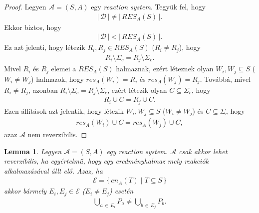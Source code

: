 \documentclass[12pt]{article}
\theoremstyle{definition}
\theoremstyle{remark}
\theoremstyle{plain}
\theoremstyle{plain}
\newtheorem*{lemma*}{Lemma}
\newcommand{\en}{\textit{en}}
\newcommand{\res}{\textit{res}}
\begin{document}
    \begin{proof}
        Legyen $\mathscr{A} = (S, A)$ egy \textit{reaction system}. Tegyük fel, hogy 
        \begin{align*}
            |\,\mathcal{D}\,| \neq |\,\textit{RES}_{A}(S)\,|.
        \end{align*}
        Ekkor biztos, hogy
        \begin{align*}
            |\,\mathcal{D}\,| < |\,\textit{RES}_{A}(S)\,|.
        \end{align*}
        Ez azt jelenti, hogy létezik $R_{i}, R_{j} \in \textit{RES}_{A}(S)$ ($R_{i} \neq R_{j}$), hogy
        \begin{align*}
            R_{i} \setminus \Sigma_{c} = R_{j} \setminus \Sigma_{c}.
        \end{align*}
        Mivel $R_{i}$ és $R_{j}$ elemei a $\textit{RES}_{A}(S)$ halmaznak, ezért léteznek olyan $W_{i}, W_{j} \subseteq S$ ($W_{i} \neq W_{j}$) halmazok, hogy $\res_{A}(W_{i}) = R_{i}$ és $\res_{A}(W_{j}) = R_{j}$. Továbbá, mivel $R_{i} \neq R_{j}$, azonban $R_{i} \setminus \Sigma_{c} = R_{j} \setminus \Sigma_{c}$, ezért létezik olyan $C \subseteq \Sigma_{c}$, hogy
        \begin{align*}
            R_{i} \cup C = R_{j} \cup C.
        \end{align*}
        Ezen állítások azt jelentik, hogy létezik $W_{i}, W_{j} \subseteq S$ ($W_{i} \neq W_{j}$) és $C \subseteq \Sigma_{c}$ hogy
        \begin{align*}
            \res_{A}(W_{i}) \cup C = \res_{A}(W_{j}) \cup C,
        \end{align*}
        azaz $\mathscr{A}$ nem reverzibilis.
    \end{proof}     

    \begin{lemma*}
        Legyen $\mathscr{A} = (S, A)$ egy \textit{reaction system}. $\mathscr{A}$ csak akkor lehet reverzibilis, ha egyértelmű, hogy egy eredményhalmaz mely reakciók alkalmazásával állt elő. Azaz, ha
        \begin{align*}
            \mathcal{E} = \{ \, \en_{A}(T) \mid T \subseteq S \,\}
        \end{align*}
        akkor bármely $E_{i}, E_{j} \in \mathcal{E}$ ($E_{i} \neq E_{j}$) esetén
        \begin{align*}
            \bigcup\limits_{a \,\in\, E_{i}} P_{a} \neq \bigcup\limits_{b \,\in\, E_{j}} P_{b}.
        \end{align*}
    \end{lemma*}
\end{document}
